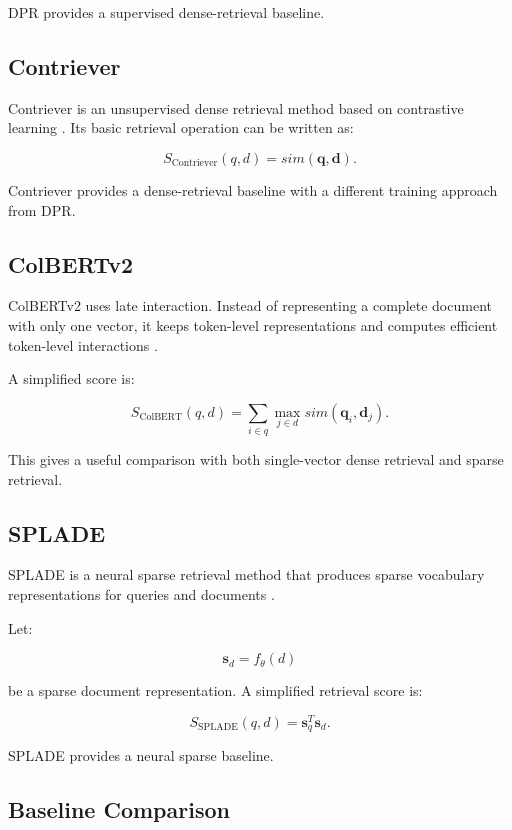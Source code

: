 \documentclass[11pt,a4paper]{article}
\begin{document}
DPR provides a supervised dense-retrieval baseline.

\subsection{Contriever}

Contriever is an unsupervised dense retrieval method based on contrastive learning \citep{izacard-grave-2021-contriever}. Its basic retrieval operation can be written as:

\[
S_{\mathrm{Contriever}}(q,d)
=
sim(\mathbf q,\mathbf d).
\]

Contriever provides a dense-retrieval baseline with a different training approach from DPR.

\subsection{ColBERTv2}

ColBERTv2 uses late interaction. Instead of representing a complete document with only one vector, it keeps token-level representations and computes efficient token-level interactions \citep{santhanam-etal-2022-colbertv2}.

A simplified score is:

\[
S_{\mathrm{ColBERT}}(q,d)
=
\sum_{i\in q}
\max_{j\in d}
sim(\mathbf q_i,\mathbf d_j).
\]

This gives a useful comparison with both single-vector dense retrieval and sparse retrieval.

\subsection{SPLADE}

SPLADE is a neural sparse retrieval method that produces sparse vocabulary representations for queries and documents \citep{formal-etal-2021-splade}.

Let:

\[
\mathbf{s}_d=f_\theta(d)
\]

be a sparse document representation. A simplified retrieval score is:

\[
S_{\mathrm{SPLADE}}(q,d)
=
\mathbf{s}_q^T\mathbf{s}_d.
\]

SPLADE provides a neural sparse baseline.

\subsection{Baseline Comparison}
\end{document}
